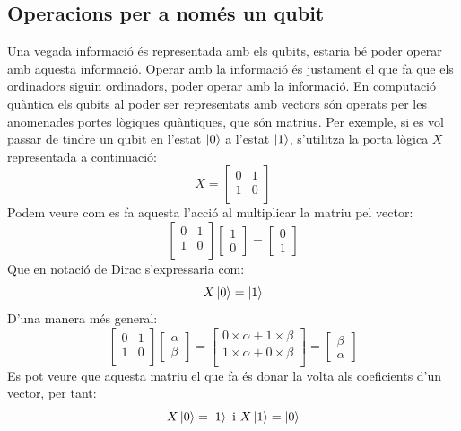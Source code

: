 \subsection{Operacions per a només un qubit}
\label{only_one_qubit}
Una vegada informació és representada amb els qubits, estaria bé poder operar amb aquesta informació. Operar amb la informació és justament el que fa que els ordinadors siguin ordinadors, poder operar amb la informació. En computació quàntica els qubits al poder ser representats amb vectors són operats per les anomenades portes lògiques quàntiques, que són matrius. Per exemple, si es vol passar de tindre un qubit en l'estat $\ket{0}$ a l'estat $\ket{1}$, s'utilitza la porta lògica $X$ representada a continuació:
$$
X = \begin{bmatrix}
	0 & 1\\
	1 & 0\\
\end{bmatrix}
$$ 
Podem veure com es fa aquesta l'acció al multiplicar la matriu pel vector:
$$
\begin{bmatrix} 0 & 1\\ 1 & 0\\ \end{bmatrix} \begin{bmatrix}1 \\ 0 \end{bmatrix} = \begin{bmatrix}0 \\ 1 \end{bmatrix}
$$
Que en notació de Dirac s'expressaria com: 
$$
X\ket{0} = \ket{1}
$$
D'una manera més general: 
$$
\begin{bmatrix} 0 & 1\\ 1 & 0\\ \end{bmatrix} 
\begin{bmatrix}\alpha \\ \beta \end{bmatrix} =
\begin{bmatrix} 0\times\alpha + 1\times\beta \\1\times\alpha + 0\times\beta \\
\end{bmatrix}
= \begin{bmatrix} \beta \\ \alpha \end{bmatrix}
$$
Es pot veure que aquesta matriu el que fa és donar la volta als coeficients d'un vector, per tant:
$$
X\ket{0} = \ket{1} \text{ i } X\ket{1} = \ket{0}
$$

